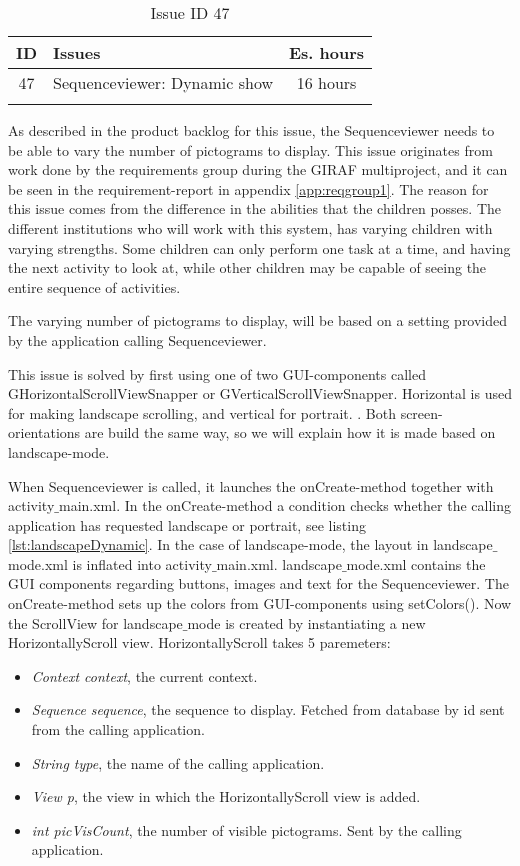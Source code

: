 \begin{longtable} { | c | p{12cm} | c | } 
\hline
	ID 	&	Issues	&		 Es. hours \\\hline
	 47	&	Sequenceviewer: Dynamic show	&	16 hours \\\hline
\caption{Issue ID 47}
\label{tab:spr3_SVdynamicshow}
\end{longtable}

As described in the product backlog for this issue, the Sequenceviewer needs to be able to vary the number of pictograms to display. This issue originates from work done by the requirements group during the GIRAF multiproject, and it can be seen in the requirement-report in appendix \ref{app:reqgroup1}. The reason for this issue comes from the difference in the abilities that the children posses. The different institutions who will work with this system, has varying children with varying strengths. Some children can only perform one task at a time, and having the next activity to look at, while other children may be capable of seeing the entire sequence of activities. 

The varying number of pictograms to display, will be based on a setting provided by the application calling Sequenceviewer.

This issue is solved by first using one of two GUI-components called GHorizontalScrollViewSnapper or GVerticalScrollViewSnapper. Horizontal is used for making landscape scrolling, and vertical for portrait. . Both screen-orientations are build the same way, so we will explain how it is made based on landscape-mode. 

When Sequenceviewer is called, it launches the onCreate-method together with activity$\_$main.xml. In the onCreate-method a condition checks whether the calling application has requested landscape or portrait, see listing \ref{lst:landscapeDynamic}. In the case of landscape-mode, the layout in landscape$\_$mode.xml is inflated into activity$\_$main.xml. landscape$\_$mode.xml contains the GUI components regarding buttons, images and text for the Sequenceviewer. The onCreate-method sets up the colors from GUI-components using setColors(). Now the ScrollView for landscape$\_$mode is created by instantiating a new HorizontallyScroll view. HorizontallyScroll takes 5 paremeters:
\begin{itemize}
\item \textit{Context context}, the current context.
\item \textit{Sequence sequence}, the sequence to display. Fetched from database by id sent from the calling application.
\item \textit{String type}, the name of the calling application.
\item \textit{View p}, the view in which the HorizontallyScroll view is added.
\item \textit{int picVisCount}, the number of visible pictograms. Sent by the calling application.
\end{itemize}

